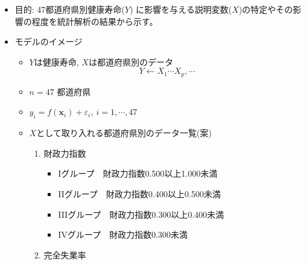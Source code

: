 \begin{itemize}
	\item 目的: 47都道府県別健康寿命($Y$) に影響を与える説明変数($X$)の特定やその影響の程度を統計解析の結果から示す。

	\item モデルのイメージ
	      \begin{itemize}
		      \item $Y$は健康寿命, $X$は都道府県別のデータ
		            $$ Y \leftarrow X_1 \cdots X_p, \cdots$$
		      \item $n=47$ 都道府県
		      \item $ y_i = f(\bm{x}_i)+\varepsilon_i,~ i= 1, \cdots, 47 $

		      \item $X$として取り入れる都道府県別のデータ一覧(案)
		            \begin{enumerate}
			            \item 財政力指数
			                  \begin{itemize} \setlength{\itemsep}{-0.5mm} \setlength{\parskip}{-0.5mm}
				                  \item  Iグループ　財政力指数0.500以上1.000未満
				                  \item IIグループ　財政力指数0.400以上0.500未満
				                  \item IIIグループ　財政力指数0.300以上0.400未満
				                  \item IVグループ　財政力指数0.300未満
			                  \end{itemize}
			            \item 完全失業率
		            \end{enumerate}
	      \end{itemize}
\end{itemize}

